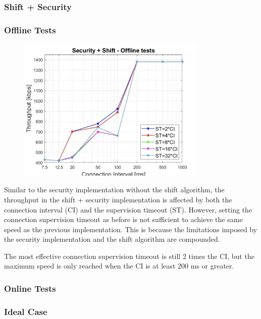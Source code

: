 \documentclass{Configuration_Files/PoliMi3i_thesis}
\begin{document}
\subsubsection*{Shift + Security}
\subsubsection*{Offline Tests}

\begin{figure}[h!]
    \centering
    \includegraphics[width=0.8\textwidth]{Results Manuel/figure22}
    \label{fig:figure1}
\end{figure}

Similar to the security implementation without the shift algorithm, the throughput in the shift + security implementation is affected by both the connection interval (CI) and the supervision timeout (ST). However, setting the connection supervision timeout as before is not sufficient to achieve the same speed as the previous implementation. This is because the limitations imposed by the security implementation and the shift algorithm are compounded.

The most effective connection supervision timeout is still 2 times the CI, but the maximum speed is only reached when the CI is at least 200 ms or greater.

\subsubsection*{Online Tests}
\subsubsection*{Ideal Case}
\end{document}
